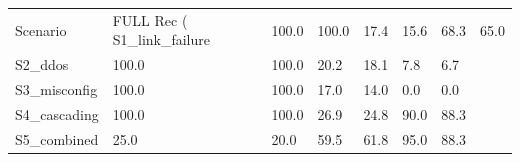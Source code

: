 \begin{tabular}{lllllll}
\toprule
Scenario & FULL Rec (%
\midrule
S1_link_failure & 100.0 & 100.0 & 17.4 & 15.6 & 68.3 & 65.0 \\
S2_ddos & 100.0 & 100.0 & 20.2 & 18.1 & 7.8 & 6.7 \\
S3_misconfig & 100.0 & 100.0 & 17.0 & 14.0 & 0.0 & 0.0 \\
S4_cascading & 100.0 & 100.0 & 26.9 & 24.8 & 90.0 & 88.3 \\
S5_combined & 25.0 & 20.0 & 59.5 & 61.8 & 95.0 & 88.3 \\
\bottomrule
\end{tabular}
